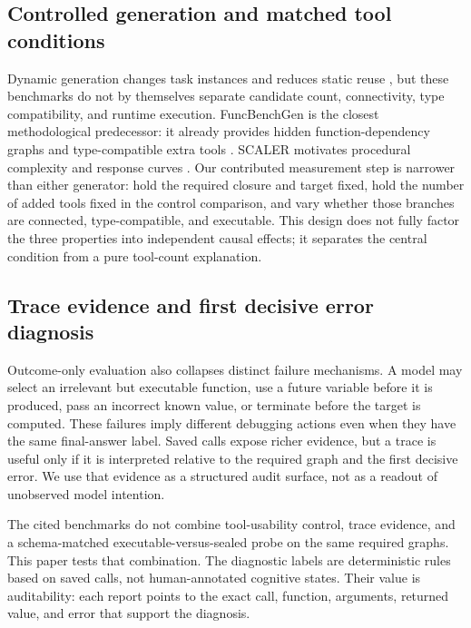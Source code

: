 \documentclass[pdflatex,sn-basic]{sn-jnl}
\begin{document}
\subsection{Controlled generation and matched tool conditions}

Dynamic generation changes task instances and reduces static reuse
\citep{srivastava2025beyondbench,li2025c2leva,chen2025dycodeeval,chen2025contamination},
but these benchmarks do not by themselves separate candidate count,
connectivity, type compatibility, and runtime execution. FuncBenchGen is the
closest methodological predecessor: it already provides hidden
function-dependency graphs and type-compatible extra tools
\citep{maekawa2025funcbenchgen}. SCALER motivates procedural complexity and
response curves \citep{ghajari2025scaler}. Our contributed measurement step is
narrower than either generator: hold the required closure and target fixed, hold
the number of added tools fixed in the control comparison, and vary whether those
branches are connected, type-compatible, and executable. This design does not
fully factor the three properties into independent causal effects; it separates
the central condition from a pure tool-count explanation.

\subsection{Trace evidence and first decisive error diagnosis}

Outcome-only evaluation also collapses distinct failure mechanisms. A model may
select an irrelevant but executable function, use a future variable before it is
produced, pass an incorrect known value, or terminate before the target is
computed. These failures imply different debugging actions even when they have
the same final-answer label. Saved calls expose richer evidence, but a trace is
useful only if it is interpreted relative to the required graph and the first
decisive error. We use that evidence as a structured audit surface, not as a
readout of unobserved model intention.

The cited benchmarks do not combine tool-usability control, trace evidence, and a
schema-matched executable-versus-sealed probe on the same required graphs. This
paper tests that combination. The diagnostic labels are deterministic rules
based on saved calls, not human-annotated cognitive states. Their value is
auditability: each report points to the exact call, function, arguments,
returned value, and error that support the diagnosis.
\end{document}
